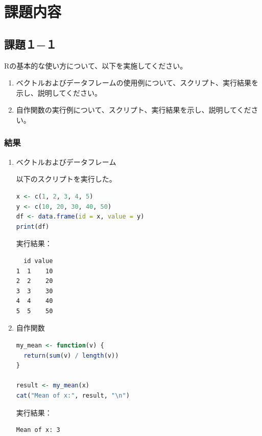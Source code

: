 \documentclass[12pt,a4paper]{ltjsarticle}
\begin{document}
\section{課題内容}\label{sec:tasks}

\subsection{課題１−１}\label{subsec:task1-1}

  Rの基本的な使い方について、以下を実施してください。

  \begin{enumerate}[label = (\alph*)]
    \item ベクトルおよびデータフレームの使用例について、スクリプト、実行結果を示し、説明してください。
    \item 自作関数の実行例について、スクリプト、実行結果を示し、説明してください。
  \end{enumerate}

  \subsubsection{結果}\label{subsubsec:task1-1-result}
  \begin{enumerate}[label = (\alph*)]
    \item ベクトルおよびデータフレーム
    
    以下のスクリプトを実行した。

\begin{lstlisting}[language=R, caption={ベクトルとデータフレームの使用例}]
x <- c(1, 2, 3, 4, 5)
y <- c(10, 20, 30, 40, 50)
df <- data.frame(id = x, value = y)
print(df)
\end{lstlisting}

実行結果：

\begin{lstlisting}
  id value
1  1    10
2  2    20
3  3    30
4  4    40
5  5    50
\end{lstlisting}

    \item 自作関数

\begin{lstlisting}[language=R, caption={自作関数の実行例（平均値の計算）}]
my_mean <- function(v) {
  return(sum(v) / length(v))
}

result <- my_mean(x)
cat("Mean of x:", result, "\n")
\end{lstlisting}

実行結果：

\begin{lstlisting}
Mean of x: 3
\end{lstlisting}

  \end{enumerate}
\end{document}
